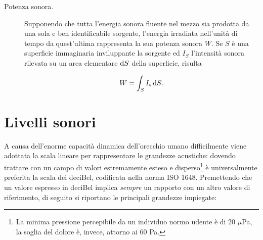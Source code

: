 \begin{description}
  \item[Potenza sonora.] Supponendo che tutta l'energia sonora fluente nel mezzo sia prodotta da una sola e
       ben identificabile sorgente, l'energia irradiata nell'unit\`a di tempo da quest'ultima rappresenta
       la sua potenza sonora $W$. Se $S$ \`e una superficie immaginaria inviluppante la sorgente ed $I_S$
       l'intensit\`a sonora rilevata su un area elementare $\mathrm{d} S$ della superficie, risulta

       \begin{equation}
	 \label{eq:power}
          W = \int_S I_s \, \mathrm{d} S.\\
       \end{equation}


\end{description}


\section{Livelli sonori}
\label{sec:levels}

A causa dell'enorme capacit\`a dinamica dell'orecchio umano difficilmente viene adottata la scala
lineare per rappresentare le grandezze acustiche: dovendo trattare con un campo di valori estremamente
esteso e disperso\footnote{ La minima pressione percepibile da un individuo normo udente \`e di 20 $\mu$Pa,
   la soglia del dolore \`e, invece, attorno ai 60 Pa.} \`e universalmente preferita la scala dei deciBel,
codificata nella norma ISO 1648. Premettendo che un valore espresso in deciBel implica \emph{sempre} un
rapporto con un altro valore di riferimento, di seguito si riportano le principali grandezze impiegate:

